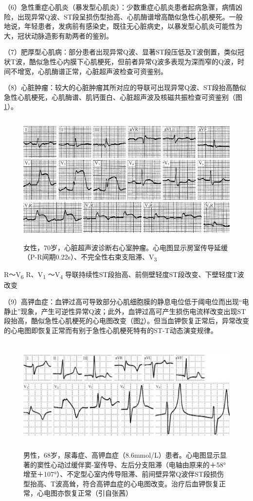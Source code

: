 （6）急性重症心肌炎（暴发型心肌炎）：少数重症心肌炎患者起病急骤，病情凶险，出现异常Q波、ST段呈损伤型抬高、心肌酶谱增高酷似急性心肌梗死。一般地说，年轻患者，发病前有感染史，既往无心脏病史，以暴发型心肌炎可能性为大，冠状动脉造影有助两者的鉴别。

（7）肥厚型心肌病：部分患者出现异常Q波、显著ST段压低及T波倒置，类似冠状T波，酷似急性心内膜下心肌梗死，但前者异常Q波多表现为深而窄的Q波，时间不增宽，心肌酶谱正常，心脏超声波检查可资鉴别。

（8）心脏肿瘤：较大的心脏肿瘤其所对应的导联可出现异常Q波、ST段抬高酷似急性心肌梗死，心肌酶谱、肌钙蛋白、心脏超声波及核磁共振检查可资鉴别（图\ref{fig44-18}）。

\begin{figure}[!htbp]
 \centering
 \includegraphics[width=5.04167in,height=2.61458in]{./images/Image00727.jpg}
 \captionsetup{justification=centering}
 \caption{女性，70岁，心脏超声波诊断右心室肿瘤。心电图显示房室传导延缓（P-R间期0.22s）、不完全性右束支阻滞、V\textsubscript{3}}
 \label{fig44-18}
  \end{figure} 
R～V\textsubscript{6} R、V\textsubscript{1} ～V\textsubscript{4}
导联持续性ST段抬高、前侧壁轻度ST段改变、下壁轻度T波改变

（9）高钾血症：血钾过高可导致部分心肌细胞膜的静息电位低于阈电位而出现“电静止”现象，产生可逆性异常Q波；此外，血钾过高可产生损伤电流样改变出现ST段抬高，酷似急性心肌梗死的心电图改变（图\ref{fig44-19}）。但当血钾恢复正常后，异常改变的心电图即恢复正常而有别于急性心肌梗死特有的ST-T动态演变规律。

\begin{figure}[!htbp]
 \centering
 \includegraphics[width=5.78125in,height=2.27083in]{./images/Image00728.jpg}
 \captionsetup{justification=centering}
 \caption{男性，68岁，尿毒症、高钾血症（8.6mmol/L）患者。心电图显示显著的窦性心动过缓伴窦-室传导、左后分支阻滞（电轴由原来的＋58°增至＋107°）、不定型心室内传导阻滞、前间壁异常Q波伴ST段损伤型抬高、T波高耸，符合高钾血症的心电图改变。治疗后血钾恢复正常，心电图亦恢复正常（引自张茜）}
 \label{fig44-19}
  \end{figure} 

